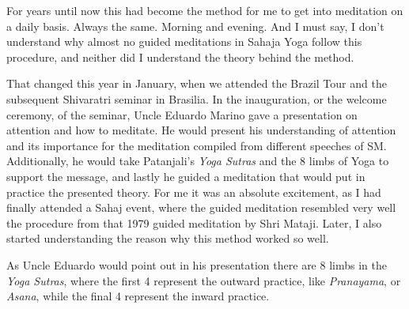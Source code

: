 \documentclass[12pt]{article}
\begin{document}
For years until now this had become the method for me to get into meditation on a daily basis.
Always the same.
Morning and evening.
And I must say, I don't understand why almost no guided meditations in Sahaja Yoga follow this procedure, and neither did I understand the theory behind the method.


That changed this year in January, when we attended the Brazil Tour and the subsequent Shivaratri seminar in Brasilia.
In the inauguration, or the welcome ceremony, of the seminar, Uncle Eduardo Marino gave a presentation on attention and how to meditate.
He would present his understanding of attention and its importance for the meditation compiled from different speeches of SM.
Additionally, he would take Patanjali's \textit{Yoga Sutras} and the 8 limbs of Yoga to support the message, and lastly he guided a meditation that would put in practice the presented theory.
For me it was an absolute excitement, as I had finally attended a Sahaj event, where the guided meditation resembled very well the procedure from
that 1979 guided meditation by Shri Mataji.
Later, I also started understanding the reason why this method worked so well.


As Uncle Eduardo would point out in his presentation there are 8 limbs in the \textit{Yoga Sutras}, where the first 4 represent the outward practice, like
\textit{Pranayama}, or \textit{Asana}, while the final 4 represent the inward practice.

\end{document}
